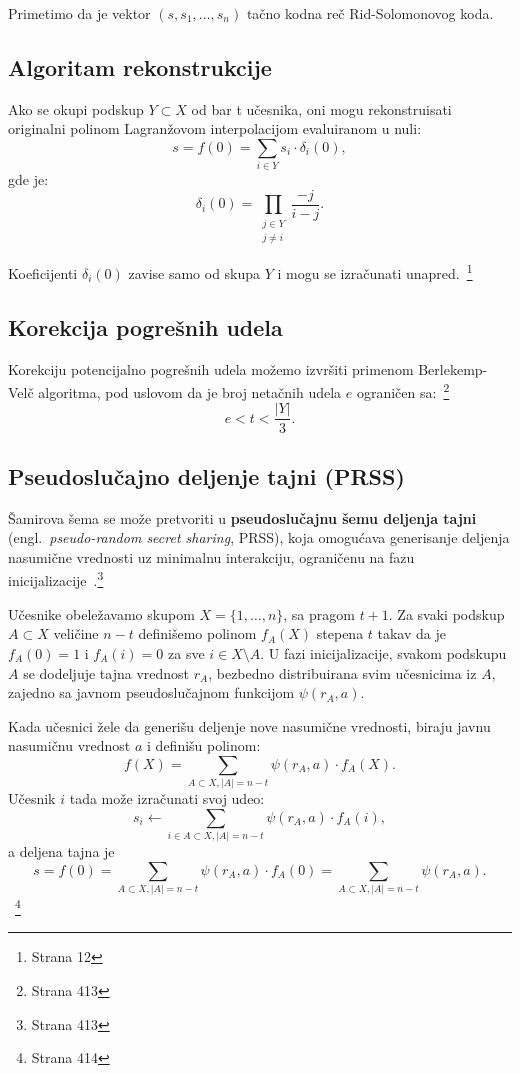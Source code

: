 Primetimo da je vektor $(s, s_1, \ldots, s_n)$ tačno kodna reč Rid-Solomonovog koda.
 
\subsection{Algoritam rekonstrukcije}
 
Ako se okupi podskup $Y \subset X$ od bar t učesnika, oni mogu rekonstruisati originalni polinom Lagranžovom interpolacijom evaluiranom u nuli:
\[s = f(0) = \sum_{i \in Y} s_i \cdot \delta_i(0),\]
gde je:
\[\delta_i(0) =\prod_{\substack{j \in Y \\ j \neq i}}\frac{-j}{i - j}.\]

Koeficijenti $\delta_i(0)$ zavise samo od skupa $Y$ i mogu se izračunati unapred.~\cite{secret-sharing}\footnote{Strana 12}

\subsection{Korekcija pogrešnih udela}
Korekciju potencijalno pogrešnih udela možemo izvršiti primenom Berlekemp-Velč algoritma, pod uslovom da je broj netačnih udela $e$ ograničen sa:~\cite{smart2016cryptography}\footnote{Strana 413}
\[e < t < \frac{|Y|}{3}.\]

\subsection{Pseudoslučajno deljenje tajni (PRSS)}

Šamirova šema se može pretvoriti u \textbf{pseudoslučajnu šemu deljenja tajni} (engl.\ \textit{pseudo-random secret sharing}, PRSS), koja omogućava generisanje deljenja nasumične vrednosti uz minimalnu interakciju, ograničenu na fazu inicijalizacije~\cite{smart2016cryptography}.\footnote{Strana 413}

Učesnike obeležavamo skupom $X = \{1, \ldots, n\}$, sa pragom $t+1$. Za svaki podskup $A \subset X$ veličine $n-t$ definišemo polinom $f_A(X)$ stepena $t$ takav da je $f_A(0) = 1$ i $f_A(i) = 0$ za sve $i \in X \setminus A$. U fazi inicijalizacije, svakom podskupu $A$ se dodeljuje tajna vrednost $r_A$, bezbedno distribuirana svim učesnicima iz $A$, zajedno sa javnom pseudoslučajnom funkcijom $\psi(r_A, a)$.

Kada učesnici žele da generišu deljenje nove nasumične vrednosti, biraju javnu nasumičnu vrednost $a$ i definišu polinom:
\[f(X) = \sum_{A \subset X, |A|=n-t} \psi(r_A, a) \cdot f_A(X).\]
Učesnik $i$ tada može izračunati svoj udeo:
\[s_i \leftarrow \sum_{i \in A \subset X, |A|=n-t} \psi(r_A, a) \cdot f_A(i),\]
a deljena tajna je \[s = f(0) = \sum_{A \subset X, |A|=n-t} \psi(r_A, a) \cdot f_A(0) = \sum_{A \subset X, |A|=n-t} \psi(r_A, a).\]~\cite{smart2016cryptography}\footnote{Strana 414}
 
